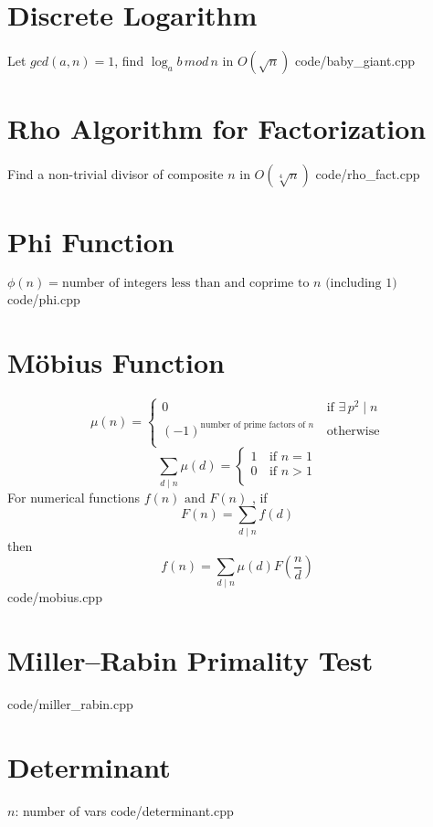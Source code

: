 \documentclass [landscape,8pt,a4paper,twocolumn]{article}
\begin{document}
\section{Discrete Logarithm}
Let $ gcd(a, n)=1 $, find $ \log_{a}{b} \, mod \, n $ in $ O(\sqrt{n}) $
 {code/baby_giant.cpp}

\section{Rho Algorithm for Factorization}
Find a non-trivial divisor of composite $ n $ in $ O(\sqrt[4]{n}) $
 {code/rho_fact.cpp}

\section{Phi Function}
$ \phi(n)= \text{number of integers less than and coprime to } n \text{ (including } 1) $
 {code/phi.cpp}

\section{Möbius Function}
\[\mu (n) =
 	\begin{cases}
		0	& \, \text{if } \exists \, p^2 \mid n \\
		(-1)^{\text{number of prime factors of } n}	& \, \text{otherwise} \\
	\end{cases}
\]
\[\sum_{d \mid n} \mu(d) =
	\begin{cases}
    	1	& \, \text{if } n=1 \\
        0	& \, \text{if } n>1 \\
	\end{cases}
\]
For numerical functions $ f(n) \text{ and } F(n) $ , if
\[
	F(n)=\sum_{d \mid n}f(d)
\]
then
\[
	f(n)=\sum_{d \mid n}\mu(d)F(\frac{n}{d})
\]
 {code/mobius.cpp}

\section{Miller–Rabin Primality Test}
 {code/miller_rabin.cpp}

\section{Determinant}
$ n $: number of vars
 {code/determinant.cpp}
\end{document}
